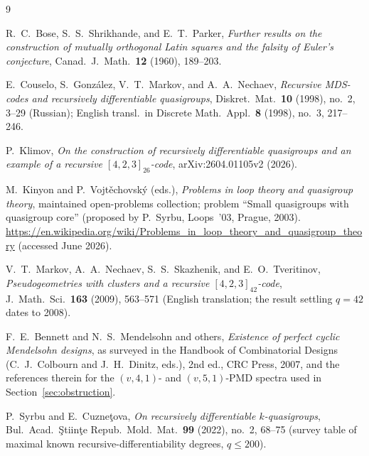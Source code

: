 \documentclass[11pt]{article}
\theoremstyle{definition}
\begin{document}
\begin{thebibliography}{9}

R.~C.~Bose, S.~S.~Shrikhande, and E.~T.~Parker,
\emph{Further results on the construction of mutually orthogonal Latin squares and the
falsity of Euler's conjecture},
Canad.\ J.\ Math.\ \textbf{12} (1960), 189--203.

E.~Couselo, S.~Gonz\'alez, V.~T.~Markov, and A.~A.~Nechaev,
\emph{Recursive MDS-codes and recursively differentiable quasigroups},
Diskret.\ Mat.\ \textbf{10} (1998), no.~2, 3--29 (Russian);
English transl.\ in Discrete Math.\ Appl.\ \textbf{8} (1998), no.~3, 217--246.

P.~Klimov,
\emph{On the construction of recursively differentiable quasigroups and an example of a
recursive $[4,2,3]_{26}$-code},
arXiv:2604.01105v2 (2026).

M.~Kinyon and P.~Vojt\v{e}chovsk\'y (eds.),
\emph{Problems in loop theory and quasigroup theory},
maintained open-problems collection; problem ``Small quasigroups with quasigroup core''
(proposed by P.~Syrbu, Loops~'03, Prague, 2003).
\url{https://en.wikipedia.org/wiki/Problems_in_loop_theory_and_quasigroup_theory}
(accessed June 2026).

V.~T.~Markov, A.~A.~Nechaev, S.~S.~Skazhenik, and E.~O.~Tveritinov,
\emph{Pseudogeometries with clusters and a recursive $[4,2,3]_{42}$-code},
J.\ Math.\ Sci.\ \textbf{163} (2009), 563--571
(English translation; the result settling $q=42$ dates to 2008).

F.~E.~Bennett and N.~S.~Mendelsohn and others,
\emph{Existence of perfect cyclic Mendelsohn designs},
as surveyed in the Handbook of Combinatorial Designs (C.~J.~Colbourn and
J.~H.~Dinitz, eds.), 2nd ed., CRC Press, 2007, and the references therein for the
$(v,4,1)$- and $(v,5,1)$-PMD spectra used in Section~\ref{sec:obstruction}.

P.~Syrbu and E.~Cuzne\c{t}ova,
\emph{On recursively differentiable $k$-quasigroups},
Bul.\ Acad.\ \c{S}tiin\c{t}e Repub.\ Mold.\ Mat.\ \textbf{99} (2022), no.~2, 68--75
(survey table of maximal known recursive-differentiability degrees, $q\le 200$).

\end{thebibliography}
\end{document}

